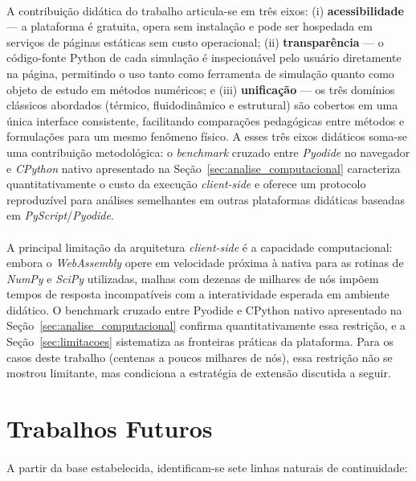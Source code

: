 \paragraph{}A contribuição didática do trabalho articula-se em três eixos: (i) \textbf{acessibilidade} --- a plataforma é gratuita, opera sem instalação e pode ser hospedada em serviços de páginas estáticas sem custo operacional; (ii) \textbf{transparência} --- o código-fonte Python de cada simulação é inspecionável pelo usuário diretamente na página, permitindo o uso tanto como ferramenta de simulação quanto como objeto de estudo em métodos numéricos; e (iii) \textbf{unificação} --- os três domínios clássicos abordados (térmico, fluidodinâmico e estrutural) são cobertos em uma única interface consistente, facilitando comparações pedagógicas entre métodos e formulações para um mesmo fenômeno físico. A esses três eixos didáticos soma-se uma contribuição metodológica: o \textit{benchmark} cruzado entre \textit{Pyodide} no navegador e \textit{CPython} nativo apresentado na Seção~\ref{sec:analise_computacional} caracteriza quantitativamente o custo da execução \textit{client-side} e oferece um protocolo reproduzível para análises semelhantes em outras plataformas didáticas baseadas em \textit{PyScript}/\textit{Pyodide}.

\paragraph{}A principal limitação da arquitetura \textit{client-side} é a capacidade computacional: embora o \textit{WebAssembly} opere em velocidade próxima à nativa para as rotinas de \textit{NumPy} e \textit{SciPy} utilizadas, malhas com dezenas de milhares de nós impõem tempos de resposta incompatíveis com a interatividade esperada em ambiente didático. O benchmark cruzado entre Pyodide e CPython nativo apresentado na Seção~\ref{sec:analise_computacional} confirma quantitativamente essa restrição, e a Seção~\ref{sec:limitacoes} sistematiza as fronteiras práticas da plataforma. Para os casos deste trabalho (centenas a poucos milhares de nós), essa restrição não se mostrou limitante, mas condiciona a estratégia de extensão discutida a seguir.

\section{Trabalhos Futuros}

\paragraph{}A partir da base estabelecida, identificam-se sete linhas naturais de continuidade:

